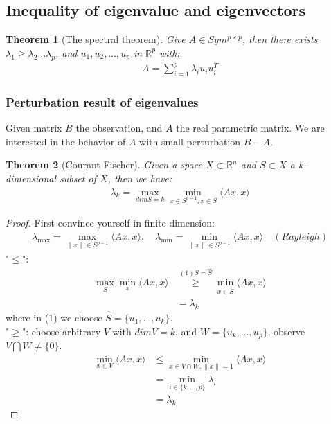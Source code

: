 \documentclass[a4paper,12pt, oneside, fleqn]{book}
\newtheorem{theorem}{Theorem}[section]
\theoremstyle{definition}
\theoremstyle{remark}
\begin{document}
\subsection{Inequality of eigenvalue and eigenvectors}
\begin{theorem}[The spectral theorem]
	Give $A \in Sym^{p \times p}$, then there exists $\lambda_1 \geq \lambda_2 \dots \lambda_p$, and $u_1, u_2, \dots, u_p$ in $\mathbb{R}^p$ with:
	\begin{align*}
		A = \sum_{i = 1}^p \lambda_i u_i u_i^T
	\end{align*}
\end{theorem}

\subsubsection*{Perturbation result of eigenvalues}
Given matrix $B$ the observation, and $A$ the real parametric matrix. We are interested in the behavior of $A$ with small perturbation $B - A$.
\begin{theorem}[Courant Fischer]
	Given a space $X \subset \mathbb{R}^n$ and $S \subset X$ a k-dimensional subset of $X$, then we have:
	\begin{align*}
		\lambda_k = \max_{dim S = k} \min_{x \in S^{p-1}, x \in S} \langle Ax, x\rangle
	\end{align*}
\end{theorem}
\begin{proof}
	First convince yourself in finite dimension:
	\begin{align*}
		\lambda_{\max} = \max_{\|x\| \in S^{p-1}}\langle Ax, x \rangle, \quad \lambda_{\min} = \min_{\|x\|\in S^{p-1}} \langle Ax, x\rangle \quad (Rayleigh)
	\end{align*}
	"$\le$":
	\begin{align*}
		\max_{S}\min_x \langle Ax, x \rangle &\overset{(1)S = \hat{S}}{\ge} \min_{x\in \hat{S}} \langle Ax, x \rangle \\
		&= \lambda_k 
	\end{align*}
	where in (1) we choose $\hat{S} = \{u_1, \dots, u_k\}$.\\
	"$\geq$": choose arbitrary $V$ with $dimV = k$, and $W= \{ u_k , \dots, u_p\}$, observe $V \bigcap W \neq \{0\}$.
	\begin{align*}
		\min_{x \in V}\langle Ax, x \rangle &\le \min_{x \in V\cap W, \|x\| = 1} \langle Ax, x \rangle \\
		& = \min_{i \in \{k, \dots, p\}} \lambda_i  \\
		&= \lambda_k
	\end{align*}
\end{proof}
\end{document}

